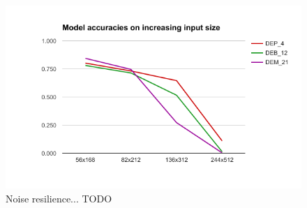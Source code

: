 
\begin{figure}
    \centering
    \includegraphics[scale=0.5]{resources/mnist_resilience.png}
    \caption{Noise resilience... TODO}
    \label{fig:mnist_resilience}
\end{figure}